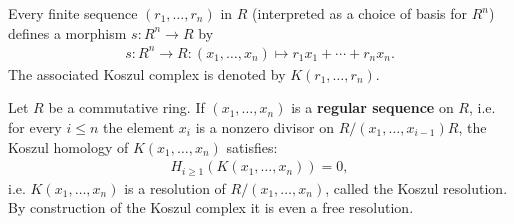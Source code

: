     \begin{example}
        Every finite sequence $(r_1,\ldots,r_n)$ in $R$ (interpreted as a choice of basis for $R^n$) defines a morphism $s:R^n\rightarrow R$ by
        \begin{gather}
            s:R^n\rightarrow R:(x_1,\ldots,x_n)\mapsto r_1x_1+\cdots+r_nx_n.
        \end{gather}
        The associated Koszul complex is denoted by $K(r_1,\ldots,r_n)$.
    \end{example}
    \begin{property}\label{homalg:koszul_resolution}
        Let $R$ be a commutative ring. If $(x_1,\ldots,x_n)$ is a \textbf{regular sequence} on $R$, i.e. for every $i\leq n$ the element $x_i$ is a nonzero divisor on $R/(x_1,\ldots,x_{i-1})R$, the Koszul homology of $K(x_1,\ldots,x_n)$ satisfies:
        \begin{gather}
            H_{i\geq1}(K(x_1,\ldots,x_n)) = 0,
        \end{gather}
        i.e. $K(x_1,\ldots,x_n)$ is a resolution of $R/(x_1,\ldots,x_n)$, called the Koszul resolution. By construction of the Koszul complex it is even a free resolution.
    \end{property}

